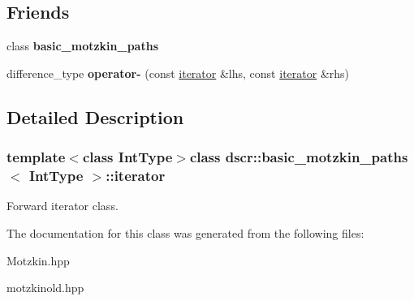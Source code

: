 \subsection*{Friends}
\begin{DoxyCompactItemize}
\item 
\hypertarget{classdscr_1_1basic__motzkin__paths_1_1iterator_a63be6a774fd8c390bcfc98a78e52930d}{class {\bfseries basic\-\_\-motzkin\-\_\-paths}}\label{classdscr_1_1basic__motzkin__paths_1_1iterator_a63be6a774fd8c390bcfc98a78e52930d}

\item 
\hypertarget{classdscr_1_1basic__motzkin__paths_1_1iterator_a4304f5d7bb1d12de2d2ad2c1e4e64dab}{difference\-\_\-type {\bfseries operator-\/} (const \hyperlink{classdscr_1_1basic__motzkin__paths_1_1iterator}{iterator} \&lhs, const \hyperlink{classdscr_1_1basic__motzkin__paths_1_1iterator}{iterator} \&rhs)}\label{classdscr_1_1basic__motzkin__paths_1_1iterator_a4304f5d7bb1d12de2d2ad2c1e4e64dab}

\end{DoxyCompactItemize}


\subsection{Detailed Description}
\subsubsection*{template$<$class Int\-Type$>$class dscr\-::basic\-\_\-motzkin\-\_\-paths$<$ Int\-Type $>$\-::iterator}

Forward iterator class. 

The documentation for this class was generated from the following files\-:\begin{DoxyCompactItemize}
\item 
Motzkin.\-hpp\item 
motzkinold.\-hpp\end{DoxyCompactItemize}
